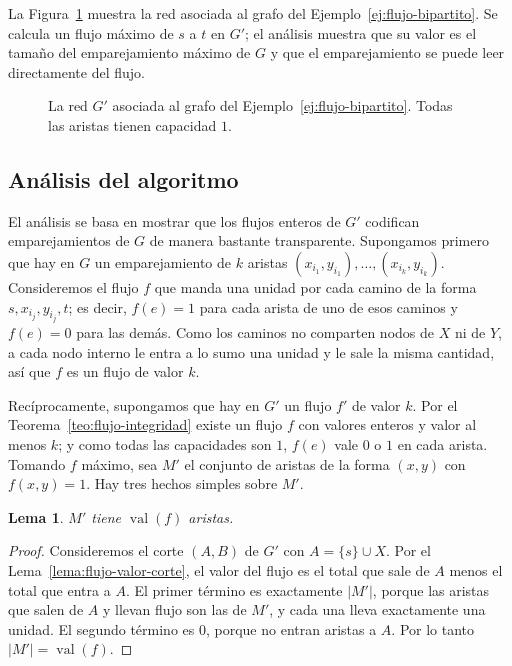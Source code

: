\documentclass[12pt, spanish, oneside, openany]{book}
\theoremstyle{uprightplain}
\newtheorem{lema}[teorema]{Lema}
\theoremstyle{definition}
\theoremstyle{remark}
\theoremstyle{definition}
\newcommand{\val}{\operatorname{val}}   %
\begin{document}
La Figura~\ref{fig:flujo-red-bipartita} muestra la red asociada al grafo del Ejemplo~\ref{ej:flujo-bipartito}. Se calcula un flujo máximo de $s$ a $t$ en $G'$; el análisis muestra que su valor es el tamaño del emparejamiento máximo de $G$ y que el emparejamiento se puede leer directamente del flujo.

\begin{figure}[H]
\centering
{}
\caption{La red $G'$ asociada al grafo del Ejemplo~\ref{ej:flujo-bipartito}. Todas
las aristas tienen capacidad $1$.}
\label{fig:flujo-red-bipartita}
\end{figure}

\subsection{Análisis del algoritmo}

El análisis se basa en mostrar que los flujos enteros de $G'$ codifican emparejamientos de $G$ de manera bastante transparente. Supongamos primero que hay en $G$ un emparejamiento de $k$ aristas $(x_{i_1},y_{i_1}),\dots,(x_{i_k},y_{i_k})$. Consideremos el flujo $f$ que manda una unidad por cada camino de la forma $s,x_{i_j},y_{i_j},t$; es decir, $f(e)=1$ para cada arista de uno de esos caminos y $f(e)=0$ para las demás. Como los caminos no comparten nodos de $X$ ni de $Y$, a cada nodo interno le entra a lo sumo una unidad y le sale la misma cantidad, así que $f$ es un flujo de valor $k$.

Recíprocamente, supongamos que hay en $G'$ un flujo $f'$ de valor $k$. Por el Teorema~\ref{teo:flujo-integridad} existe un flujo $f$ con valores enteros y valor al menos $k$; y como todas las capacidades son $1$, $f(e)$ vale $0$ o $1$ en cada arista. Tomando $f$ máximo, sea $M'$ el conjunto de aristas de la forma $(x,y)$ con $f(x,y)=1$. Hay tres hechos simples sobre $M'$.

\begin{lema}
\label{lema:flujo-mprima-k}
$M'$ tiene $\val(f)$ aristas.
\end{lema}
\begin{proof}
Consideremos el corte $(A,B)$ de $G'$ con $A=\{s\}\cup X$. Por el Lema~\ref{lema:flujo-valor-corte}, el valor del flujo es el total que sale de $A$ menos el total que entra a $A$. El primer término es exactamente $|M'|$, porque las aristas que salen de $A$ y llevan flujo son las de $M'$, y cada una lleva exactamente una unidad. El segundo término es $0$, porque no entran aristas a $A$. Por lo tanto $|M'|=\val(f)$.
\end{proof}
\end{document}
